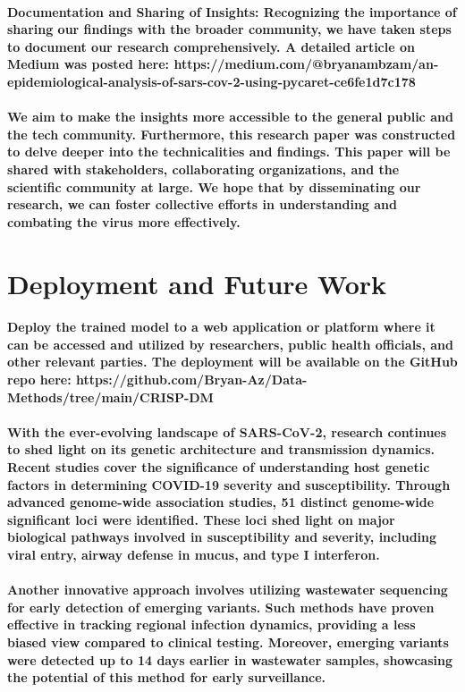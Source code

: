 \documentclass{article}
\begin{document}
\paragraph{\textbf{Documentation and Sharing of Insights}: Recognizing the importance of sharing our findings with the broader community, we have taken steps to document our research comprehensively. A detailed article on Medium was posted here: https://medium.com/@bryanambzam/an-epidemiological-analysis-of-sars-cov-2-using-pycaret-ce6fe1d7c178}
\paragraph{We aim to make the insights more accessible to the general public and the tech community. Furthermore, this research paper was constructed to delve deeper into the technicalities and findings. This paper will be shared with stakeholders, collaborating organizations, and the scientific community at large. We hope that by disseminating our research, we can foster collective efforts in understanding and combating the virus more effectively.}
\section{\textbf{Deployment and Future Work}}
\paragraph{Deploy the trained model to a web application or platform where it can be accessed and utilized by researchers, public health officials, and other relevant parties. The deployment will be available on the GitHub repo here: https://github.com/Bryan-Az/Data-Methods/tree/main/CRISP-DM}
\paragraph{With the ever-evolving landscape of SARS-CoV-2, research continues to shed light on its genetic architecture and transmission dynamics. Recent studies \cite{masahiro_kanai_69ddf437} cover the significance of understanding host genetic factors in determining COVID-19 severity and susceptibility. Through advanced genome-wide association studies, 51 distinct genome-wide significant loci were identified. These loci shed light on major biological pathways involved in susceptibility and severity, including viral entry, airway defense in mucus, and type I interferon.}
\paragraph{Another innovative approach \cite{smruthi_karthikeyan_cd33e450} involves utilizing wastewater sequencing for early detection of emerging variants. Such methods have proven effective in tracking regional infection dynamics, providing a less biased view compared to clinical testing. Moreover, emerging variants were detected up to 14 days earlier in wastewater samples, showcasing the potential of this method for early surveillance.}
\end{document}
